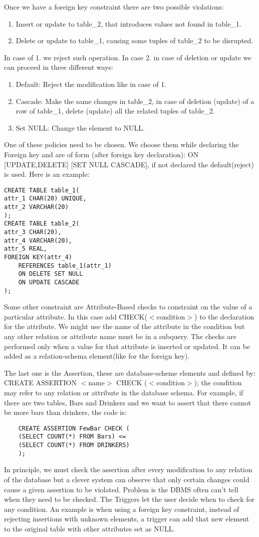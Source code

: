 \documentclass[a4page, 11pt]{article}
\begin{document}
Once we have a foreign key constraint there are two possible violations:
\begin{enumerate}[noitemsep]
	\item Insert or update to table\_2, that introduces values not found in table\_1.
	\item Delete or update to table\_1, causing some tuples of table\_2 to be disrupted.
\end{enumerate}
In case of 1. we reject such operation. In case 2. in case of deletion or update we can proceed in three different ways:
\begin{enumerate}[noitemsep]
	\item Default: Reject the modification like in case of 1.
	\item Cascade: Make the same changes in table\_2, in case of deletion (update) of a row of table\_1, delete (update) all the related tuples of table\_2.
	\item Set NULL: Change the element to NULL.
\end{enumerate}
One of these policies need to be chosen. We choose them while declaring the Foreign key and are of form (after foreign key declaration): ON [UPDATE,DELETE] [SET NULL CASCADE], if not declared the default(reject) is used. Here is an example:
\begin{lstlisting}
CREATE TABLE table_1(
attr_1 CHAR(20) UNIQUE,
attr_2 VARCHAR(20)
);
CREATE TABLE table_2(
attr_3 CHAR(20),
attr_4 VARCHAR(20),
attr_5 REAL,
FOREIGN KEY(attr_4)
	REFERENCES table_1(attr_1)
	ON DELETE SET NULL
	ON UPDATE CASCADE
);
\end{lstlisting}

Some other constraint are Attribute-Based checks to constraint on the value of a particular attribute. In this case add CHECK($<$condition$>$) to the declaration for the attribute. We might use the name of the attribute in the condition but any other relation or attribute name must be in a subquery.
The checks are performed only when a value for that attribute is inserted or updated.
It can be added as a relation-schema element(like for the foreign key).

The last one is the Assertion, these are database-scheme elements and defined by: \newline CREATE ASSERTION $<$name$>$ CHECK ($<$condition$>$); the condition may refer to any relation or attribute in the database schema.
For example, if there are two tables, Bars and Drinkers and we want to assert that there cannot be more bars than drinkers, the code is:
\begin{lstlisting}
	CREATE ASSERTION FewBar CHECK (
	(SELECT COUNT(*) FROM Bars) <=
	(SELECT COUNT(*) FROM DRINKERS)
	);
\end{lstlisting}
In principle, we must check the assertion after every modification to any relation of the database but a clever system can observe that only certain changes could cause a given assertion to be violated. 
Problem is the DBMS often can't tell when they need to be checked. 
The Triggers let the user decide when to check for any condition.
An example is when using a foreign key constraint, instead of rejecting insertions with unknown elements, a trigger can add that new element to the original table with other attributes set as NULL.
\end{document}
